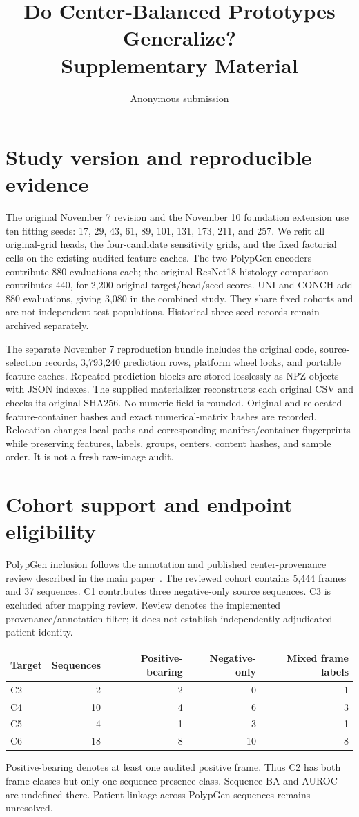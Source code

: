 \documentclass[10pt,letterpaper]{article}
\title{Do Center-Balanced Prototypes Generalize?\\Supplementary Material}
\author{Anonymous submission}
\date{}
\begin{document}
\maketitle

\section{Study version and reproducible evidence}
The original November 7 revision and the November 10 foundation extension use ten fitting seeds: 17, 29, 43, 61, 89, 101, 131, 173, 211, and 257. We refit all original-grid heads, the four-candidate sensitivity grids, and the fixed factorial cells on the existing audited feature caches. The two PolypGen encoders contribute 880 evaluations each; the original ResNet18 histology comparison contributes 440, for 2,200 original target/head/seed scores. UNI and CONCH add 880 evaluations, giving 3,080 in the combined study. They share fixed cohorts and are not independent test populations. Historical three-seed records remain archived separately.

The separate November 7 reproduction bundle includes the original code, source-selection records, 3,793,240 prediction rows, platform wheel locks, and portable feature caches. Repeated prediction blocks are stored losslessly as NPZ objects with JSON indexes. The supplied materializer reconstructs each original CSV and checks its original SHA256. No numeric field is rounded. Original and relocated feature-container hashes and exact numerical-matrix hashes are recorded. Relocation changes local paths and corresponding manifest/container fingerprints while preserving features, labels, groups, centers, content hashes, and sample order. It is not a fresh raw-image audit.

\section{Cohort support and endpoint eligibility}
PolypGen inclusion follows the annotation and published center-provenance review described in the main paper~\cite{ali2023polypgen}. The reviewed cohort contains 5,444 frames and 37 sequences. C1 contributes three negative-only source sequences. C3 is excluded after mapping review. Review denotes the implemented provenance/annotation filter; it does not establish independently adjudicated patient identity.

\begin{center}
\begin{tabular}{lrrrr}
\toprule Target & Sequences & Positive-bearing & Negative-only & Mixed frame labels\\
\midrule
C2 & 2 & 2 & 0 & 1\\
C4 & 10 & 4 & 6 & 3\\
C5 & 4 & 1 & 3 & 1\\
C6 & 18 & 8 & 10 & 8\\
\bottomrule
\end{tabular}
\end{center}
Positive-bearing denotes at least one audited positive frame. Thus C2 has both frame classes but only one sequence-presence class. Sequence BA and AUROC are undefined there. Patient linkage across PolypGen sequences remains unresolved.
\end{document}
